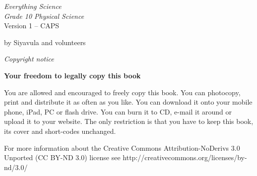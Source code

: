 
\begin{titlepage}
\begin{center}
    \thispagestyle{empty}

    \vspace*{4in}

    
    {\normalfont\sffamily\fontsize{36}\normalfont\itshape{Everything Science} \\ \vspace*{1cm}
     \normalfont\sffamily\fontsize{22}\normalfont\itshape{Grade 10 Physical Science}}
    \vspace*{1in} \\
    \LARGE Version 1 -- CAPS \\

   {\vspace*{2in}
     by Siyavula and volunteers 
  

\vfill

    }
\end{center}
\end{titlepage}






\newpage
\thispagestyle{empty}
\begin{center}
\normalfont\sffamily\fontsize{22}\normalfont\itshape Copyright notice\\

\vspace*{1in}

\textbf{Your freedom to legally copy this book}\\

\end{center}


{\LARGE
You are allowed and encouraged to freely copy this book. You can photocopy, print and distribute it as
often as you like. You can download it onto your mobile phone, iPad, PC or flash drive. You can burn it
to CD, e-mail it around or upload it to your website.
The only restriction is that you have to keep this book, its cover and short-codes unchanged.


For more information about the Creative Commons Attribution-NoDerivs 3.0 Unported (CC BY-ND 3.0) license see http://creativecommons.org/licenses/by-nd/3.0/}

\vspace*{4in}

